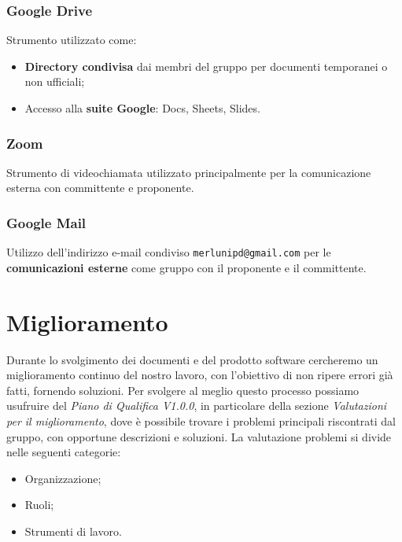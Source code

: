 \subsubsection{Google Drive}
Strumento utilizzato come:
\begin{itemize}
  \item \textbf{Directory condivisa} dai membri del gruppo per documenti temporanei o non ufficiali;
  \item Accesso alla \textbf{suite Google}: Docs, Sheets, Slides.
\end{itemize}

\subsubsection{Zoom}
Strumento di videochiamata utilizzato principalmente per la comunicazione esterna con committente e proponente.

\subsubsection{Google Mail}
Utilizzo dell'indirizzo e-mail condiviso \texttt{merlunipd@gmail.com} per le \textbf{comunicazioni esterne} come gruppo con il proponente e il committente.

\section{Miglioramento}
Durante lo svolgimento dei documenti e del prodotto software cercheremo un miglioramento continuo del nostro lavoro, con l'obiettivo di non ripere errori già fatti, fornendo soluzioni. Per svolgere al meglio questo processo possiamo usufruire del \textit{Piano di Qualifica V1.0.0}, in particolare della sezione \textit{Valutazioni per il miglioramento}, dove è possibile trovare i problemi principali riscontrati dal gruppo, con opportune descrizioni e soluzioni. La valutazione problemi si divide nelle seguenti categorie:
\begin{itemize}
  \item Organizzazione;
  \item Ruoli;
  \item Strumenti di lavoro.
\end{itemize}


